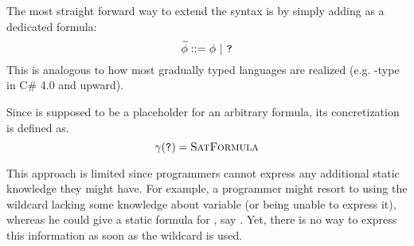 
The most straight forward way to extend the syntax is by simply adding \qm as a dedicated formula:
\begin{displaymath}
\widetilde{\phi} ::= \phi ~|~ \texttt{?}
\end{displaymath}
This is analogous to how most gradually typed languages are realized (e.g. -type in C\# 4.0 and upward).

Since \qm is supposed to be a placeholder for an arbitrary formula, its concretization is defined as.
\begin{displaymath}
\gamma(\texttt{?}) = \textsc{SatFormula}
\end{displaymath}


This approach is limited since programmers cannot express any additional static knowledge they might have.
For example, a programmer might resort to using the wildcard lacking some knowledge about variable  (or being unable to express it), whereas he could give a static formula for , say .
Yet, there is no way to express this information as soon as the wildcard is used.
